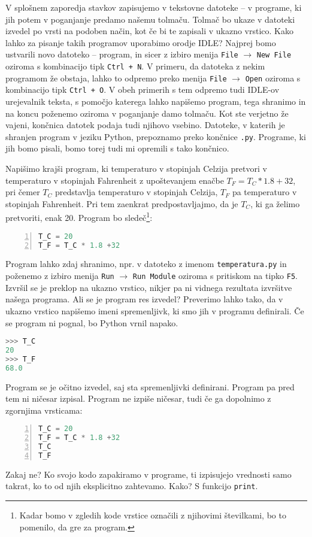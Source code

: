 V splošnem zaporedja stavkov zapisujemo v tekstovne datoteke -- v programe, ki jih potem v poganjanje predamo našemu tolmaču. Tolmač bo ukaze v datoteki izvedel po vrsti na podoben način, kot če bi te zapisali v ukazno vrstico. Kako lahko za pisanje takih programov uporabimo orodje IDLE? Najprej bomo ustvarili novo datoteko -- program, in sicer z izbiro menija \texttt{File} $\rightarrow$ \texttt{New File} oziroma s kombinacijo tipk \texttt{Ctrl + N}. V primeru, da datoteka z nekim programom že obstaja, lahko to odpremo preko menija \texttt{File} $\rightarrow$ \texttt{Open} oziroma s kombinacijo tipk \texttt{Ctrl + O}. V obeh primerih s tem odpremo tudi IDLE-ov urejevalnik teksta, s pomočjo katerega lahko napišemo program, tega shranimo in na koncu poženemo oziroma v poganjanje damo tolmaču. Kot ste verjetno že vajeni, končnica datotek podaja tudi njihovo vsebino. Datoteke, v katerih je shranjen program v jeziku Python, prepoznamo preko končnice \texttt{.py}. Programe, ki jih bomo pisali, bomo torej tudi mi opremili s tako končnico.

Napišimo krajši program, ki temperaturo v stopinjah Celzija pretvori v temperaturo v stopinjah Fahrenheit z upoštevanjem enačbe $T_F = T_C * 1.8 +32$, pri čemer $T_C$ predstavlja temperaturo v stopinjah Celzija, $T_F$ pa temperaturo v stopinjah Fahrenheit. Pri tem zaenkrat predpostavljajmo, da je $T_C$, ki ga želimo pretvoriti, enak 20. Program bo sledeč\footnote{Kadar bomo v zgledih kode vrstice označili z njihovimi številkami, bo to pomenilo, da gre za program.}:
\begin{lstlisting}[language=Python, showstringspaces=false,numbers=left]
T_C = 20
T_F = T_C * 1.8 +32
\end{lstlisting}
Program lahko zdaj shranimo, npr. v datoteko z imenom \texttt{temperatura.py} in poženemo z izbiro menija \texttt{Run} $\rightarrow$ \texttt{Run Module} oziroma s pritiskom na tipko \texttt{F5}. Izvršil se je preklop na ukazno vrstico, nikjer pa ni vidnega rezultata izvršitve našega programa. Ali se je program res izvedel? Preverimo lahko tako, da v ukazno vrstico napišemo imeni spremenljivk, ki smo jih v programu definirali. Če se program ni pognal, bo Python vrnil napako.
\begin{lstlisting}[language=Python, showstringspaces=false]
>>> T_C
20
>>> T_F
68.0
\end{lstlisting}
Program se je očitno izvedel, saj sta spremenljivki definirani. Program pa pred tem ni ničesar izpisal. Program ne izpiše ničesar, tudi če ga dopolnimo z zgornjima vrsticama:
\begin{lstlisting}[language=Python, showstringspaces=false,numbers=left]
T_C = 20
T_F = T_C * 1.8 +32
T_C
T_F
\end{lstlisting}
Zakaj ne? Ko svojo kodo zapakiramo v programe, ti izpisujejo vrednosti samo takrat, ko to od njih eksplicitno zahtevamo. Kako? S funkcijo \texttt{print}.

